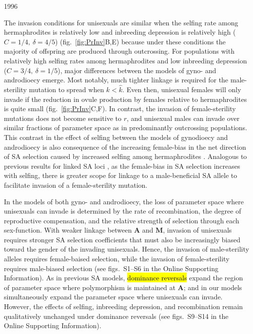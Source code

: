 1996\documentclass[9pt,twocolumn,twoside,lineno]{gsajnl}
\begin{document}
The invasion conditions for unisexuals are similar when the selfing rate among hermaphrodites is relatively low and inbreeding depression is relatively high ($C = 1/4,~\delta = 4/5$) (fig.~\ref{fig:PrInv}B,E) because under these conditions the majority of offspring are produced through outcrossing. For populations with relatively high selfing rates among hermaphrodites and low inbreeding depression ($C = 3/4,~\delta = 1/5$), major differences between the models of gyno- and androdioecy emerge. Most notably, much tighter linkage is required for the male-sterility mutation to spread when $k < \hat{k}$. Even then, unisexual females will only invade if the reduction in ovule production by females relative to hermaphrodites is quite small (fig.~\ref{fig:PrInv}C,F). In contrast, the invasion of female-sterility mutations does not become sensitive to $r$, and unisexual males can invade over similar fractions of parameter space as in predominantly outcrossing populations. This contrast in the effect of selfing between the models of gynodioecy and androdioecy is also consequence of the increasing female-bias in the net direction of SA selection caused by increased selfing among hermaphrodites \citep{Charlesworth1978a,JordanConnallon2014,Olito2016}. Analogous to previous results for linked SA loci \citep{Olito2016}, as the female-bias in SA selection increases with selfing, there is greater scope for linkage to a male-beneficial SA allele to facilitate invasion of a female-sterility mutation.

In the models of both gyno- and androdioecy, the loss of parameter space where unisexuals can invade is determined by the rate of recombination, the degree of reproductive compensation, and the relative strength of selection through each sex-function. With weaker linkage between $\mathbf{A}$ and $\mathbf{M}$, invasion of unisexuals requires stronger SA selection coefficients that must also be increasingly biased toward the gender of the invading unisexuals. Hence, the invasion of male-sterility alleles requires female-baised selection, while the invasion of female-sterility requires male-biased selection (see figs.~S1--S6 in the Online Supporting Information). As in previous SA models, \hl{dominance reversals} expand the region of parameter space where polymorphism is maintained at $\mathbf{A}$; and in our models simultaneously expand the parameter space where unisexuals can invade. However, the effects of selfing, inbreeding depression, and recombination remain qualitatively unchanged under dominance reversals (see figs.~S9--S14 in the Online Supporting Information).
\end{document}
